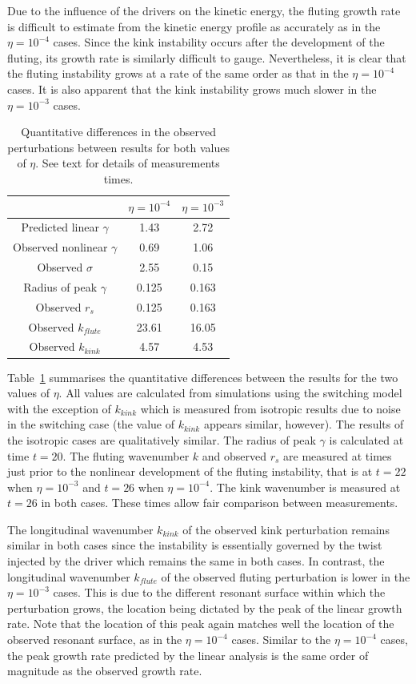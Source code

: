 \documentclass[12pt]{article}
\begin{document}
Due to the influence of the drivers on the kinetic energy, the fluting growth rate is difficult to estimate from the kinetic energy profile as accurately as in the $\eta=10^{-4}$ cases. Since the kink instability occurs after the development of the fluting, its growth rate is similarly difficult to gauge. Nevertheless, it is clear that the fluting instability grows at a rate of the same order as that in the $\eta=10^{-4}$ cases. It is also apparent that the kink instability grows much slower in the $\eta=10^{-3}$ cases.

\begin{table}[]
\centering
\begin{tabular}{ccc}
&
$\eta=10^{-4}$ &
$\eta=10^{-3}$ \\
\midrule
Predicted linear $\gamma$ & 1.43 & 2.72  \\
Observed nonlinear $\gamma$ & 0.69 & 1.06  \\
Observed $\sigma$ & 2.55 & 0.15\\
\midrule
Radius of peak $\gamma$ & 0.125 & 0.163 \\
Observed $r_s$ & 0.125 & 0.163 \\
\midrule
Observed $k_{flute}$ & 23.61 & 16.05 \\
Observed $k_{kink}$ & 4.57 & 4.53 \\
\end{tabular}
\caption{Quantitative differences in the observed perturbations between results for both values of $\eta$. See text for details of measurements times.}
\label{tab:kink_fluting_params}
\end{table}

Table~\ref{tab:kink_fluting_params} summarises the quantitative differences between the results for the two values of $\eta$. All values are calculated from simulations using the switching model with the exception of $k_{kink}$ which is measured from isotropic results due to noise in the switching case (the value of $k_{kink}$ appears similar, however). The results of the isotropic cases are qualitatively similar. The radius of peak $\gamma$ is calculated at time $t=20$. The fluting wavenumber $k$ and observed $r_s$ are measured at times just prior to the nonlinear development of the fluting instability, that is at $t=22$ when $\eta=10^{-3}$ and $t=26$ when $\eta = 10^{-4}$. The kink wavenumber is measured at $t=26$ in both cases. These times allow fair comparison between measurements.

The longitudinal wavenumber $k_{kink}$ of the observed kink perturbation remains similar in both cases since the instability is essentially governed by the twist injected by the driver which remains the same in both cases. In contrast, the longitudinal wavenumber $k_{flute}$ of the observed fluting perturbation is lower in the $\eta=10^{-3}$ cases. This is due to the different resonant surface within which the perturbation grows, the location being dictated by the peak of the linear growth rate. Note that the location of this peak again matches well the location of the observed resonant surface, as in the $\eta=10^{-4}$ cases. Similar to the $\eta=10^{-4}$ cases, the peak growth rate predicted by the linear analysis is the same order of magnitude as the observed growth rate.
\end{document}
